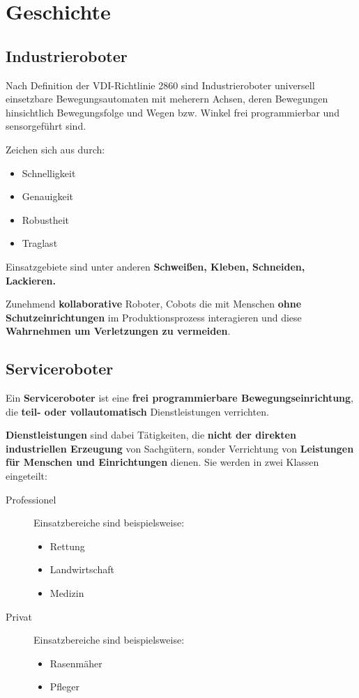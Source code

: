 \chapter{Geschichte}
\section{Industrieroboter}
Nach Definition der VDI-Richtlinie 2860 sind Industrieroboter universell
einsetzbare Bewegungsautomaten mit meherern Achsen, deren Bewegungen
hinsichtlich Bewegungsfolge und Wegen bzw. Winkel frei programmierbar und
sensorgeführt sind.

Zeichen sich aus durch:
\begin{itemize}
	\item Schnelligkeit
	\item Genauigkeit
	\item Robustheit
	\item Traglast
\end{itemize}

Einsatzgebiete sind unter anderen \textbf{Schweißen, Kleben, Schneiden,
Lackieren.}

Zunehmend \textbf{kollaborative} Roboter, Cobots die mit Menschen \textbf{ohne
Schutzeinrichtungen} im Produktionsprozess interagieren und diese
\textbf{Wahrnehmen um Verletzungen zu vermeiden}.

\section{Serviceroboter}
Ein \textbf{Serviceroboter} ist eine \textbf{frei programmierbare
Bewegungseinrichtung}, die \textbf{teil- oder vollautomatisch} Dienstleistungen
verrichten.

\textbf{Dienstleistungen} sind dabei Tätigkeiten, die \textbf{nicht der
direkten industriellen Erzeugung} von Sach\-gütern, sonder Verrichtung von
\textbf{Leistungen für Menschen und Einrichtungen} dienen. Sie werden in
zwei Klassen eingeteilt:

\begin{description}
	\item[Professionel] Einsatzbereiche sind beispielsweise:
		\begin{itemize}
			\item Rettung
			\item Landwirtschaft
			\item Medizin
		\end{itemize}
	\item[Privat] Einsatzbereiche sind beispielsweise:
		\begin{itemize}
			\item Rasenmäher
			\item Pfleger
		\end{itemize}
\end{description}
